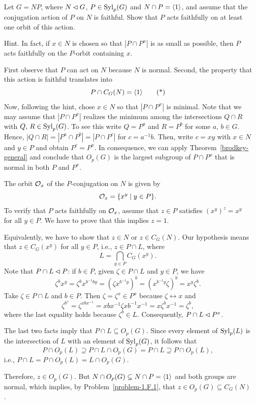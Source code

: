 \begin{probl}\label{problem-1.F.3}
    Let\/ $G=NP$, where\/ $N\lhd G$, $P\in{\rm Syl}_p(G)$ and\/ $N\cap P=\langle1\rangle$, and assume that the conjugation action of\/ $P$ on\/ $N$ is faithful. Show that\/ $P$ acts faithfully on at least one orbit of this action.

    \textrm{\upshape Hint. In fact, if $x\in N$ is chosen so that $|P\cap P^x|$ is as small as possible, then $P$ acts faithfully on the $P$-orbit containing $x$.}
\end{probl}

\begin{solution} First observe that $P$ can act on $N$ because $N$ is normal. Second, the property that this action is faithful translates into
\begin{equation*}
    P\cap C_G(N)=\langle1\rangle\tag{*}
\end{equation*}
Now, following the hint, chose $x\in N$ so that $|P\cap P^x|$ is minimal. Note that we may assume that $|P\cap P^x|$ realizes the minimum among the intersections $Q\cap R$ with $Q,\,R\in{\rm Syl}_p(G)$. To see this write $Q=P^a$ and $R=P^b$ for some $a,\,b\in G$. Hence, $|Q\cap R|= |P^a\cap P^b|=|P\cap P^c|$ for $c=a^{-1}b$. Then, write $c=xy$ with $x\in N$ and $y\in P$ and obtain $P^c=P^x$. In consequence, we can apply Theorem~\ref{brodkey-general} and conclude that $O_p(G)$ is the largest subgroup of $P\cap P^x$ that is normal in both $P$ and $P^x$.

The orbit ${\cal O}_x$ of the $P$-conjugation on $N$ is given by
$$
    {\cal O}_x = \{x^y\mid y\in P\}.
$$
To verify that $P$ acts faithfully on ${\cal O}_x$, assume that $z\in P$ satisfies $(x^y)^z=x^y$ for all $y\in P$. We have to prove that this implies $z=1$. 

Equivalently, we have to show that $z\in N$ or $z\in C_G(N)$. Our hypothesis means that $z\in C_G(x^y)$ for all $y\in P$, i.e., $z\in P\cap L$, where
$$
    L = \bigcap_{y\in P}C_G(x^y).
$$
Note that $P\cap L\lhd P$: if $b\in P$, given $\zeta\in P\cap L$ and $y\in P$, we have
$$
    \zeta^bx^y = \zeta^bx^{b^{-1}by}=(\zeta x^{b^{-1}y})^b
        =(x^{b^{-1}y}\zeta)^b = x^y\zeta^b.
$$
Take $\zeta\in P\cap L$ and $b\in P$. Then $\zeta=\zeta^x\in P^x$ because $\zeta\leftrightarrow x$ and
$$
    \zeta^{b^x}=\zeta^{xbx^{-1}}=xbx^{-1}\zeta xb^{-1}x^{-1}
        = x\zeta^bx^{-1}=\zeta^b,
$$
where the last equality holds because $\zeta^b\in L$. Consequently, $P\cap L\lhd P^x$.

The last two facts imply that $P\cap L\subseteq O_p(G)$. Since every element of ${\rm Syl}_p(L)$ is the intersection of $L$ with an element of ${\rm Syl}_p(G)$, it follows that
$$
    P\cap O_p(L) \supseteq P\cap L\cap O_p(G) = P\cap L \supseteq P\cap O_p(L),
$$
i.e., $P\cap L=P\cap O_p(L)=L\cap O_p(G)$.

Therefore, $z\in O_p(G)$. But $N\cap O_p(G)\subseteq N\cap P=\langle1\rangle$ and both groups are normal, which implies, by Problem~\ref{problem-1.F.1}, that $z\in O_p(G)\subseteq C_G(N)$.  \end{solution}

